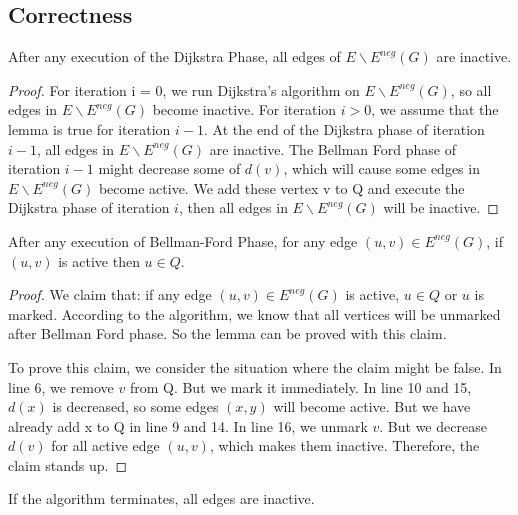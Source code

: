 \documentclass[11pt]{article}
\newcommand{\eneg}{E^{neg}}
\begin{document}
\subsection{Correctness}
\begin{lemma} \label{lem:dijkstraphase}
    After any execution of the Dijkstra Phase, all edges of $E \backslash \eneg(G)$ are inactive.
\end{lemma}
\begin{proof}
    For iteration i = 0, we run Dijkstra's algorithm on $E \backslash \eneg(G)$, so all edges in $E \backslash \eneg(G)$ become inactive. For iteration $i > 0$, we assume that the lemma is true for iteration $i - 1$. At the end of the Dijkstra phase of iteration $i - 1$, all edges in $E \backslash \eneg(G)$ are inactive. The Bellman Ford phase of iteration $i - 1$ might decrease some of $d(v)$, which will cause some edges in $E \backslash \eneg(G)$ become active. We add these vertex v to Q and execute the Dijkstra phase of iteration $i$, then all edges in $E \backslash \eneg(G)$ will be inactive.
\end{proof}

\begin{lemma}
    After any execution of Bellman-Ford Phase, for any edge $(u, v) \in \eneg(G)$, if $(u, v)$ is active then $u \in Q$.
\end{lemma}
\begin{proof}
    We claim that: if any edge $(u, v) \in \eneg(G)$ is active, $u \in Q$ or $u$ is marked. According to the algorithm, we know that all vertices will be unmarked after Bellman Ford phase. So the lemma can be proved with this claim.
    
    To prove this claim, we consider the situation where the claim might be false. In line 6, we remove $v$ from Q. But we mark it immediately. In line 10 and 15, $d(x)$ is decreased, so some edges $(x, y)$ will become active. But we have already add x to Q in line 9 and 14. In line 16, we unmark $v$. But we decrease $d(v)$ for all active edge $(u, v)$, which makes them inactive. Therefore, the claim stands up.
\end{proof}

\begin{corollary}
    If the algorithm terminates, all edges are inactive.
\end{corollary}
\end{document}
